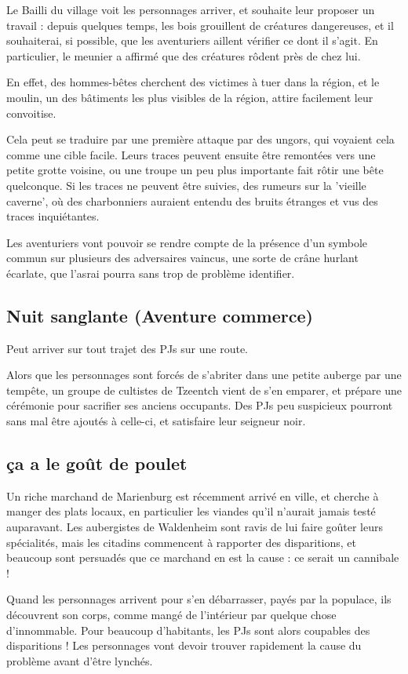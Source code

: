 \documentclass[10pt,a4paper]{book}
\begin{document}
Le Bailli du village voit les personnages arriver, et souhaite leur proposer un travail : depuis quelques temps, les bois grouillent de créatures dangereuses, et il souhaiterai, si possible, que les aventuriers aillent vérifier ce dont il s'agit. En particulier, le meunier a affirmé que des créatures rôdent près de chez lui.

En effet, des hommes-bêtes cherchent des victimes à tuer dans la région, et le moulin, un des bâtiments les plus visibles de la région, attire facilement leur convoitise.

Cela peut se traduire par une première attaque par des ungors, qui voyaient cela comme une cible facile. Leurs traces peuvent ensuite être remontées vers une petite grotte voisine, ou une troupe un peu plus importante fait rôtir une bête quelconque. Si les traces ne peuvent être suivies, des rumeurs sur la 'vieille caverne', où des charbonniers auraient entendu des bruits étranges et vus des traces inquiétantes.

Les aventuriers vont pouvoir se rendre compte de la présence d'un symbole commun sur plusieurs des adversaires vaincus, une sorte de crâne hurlant écarlate, que l'asrai pourra sans trop de problème identifier.
\subsection{Nuit sanglante (Aventure commerce)}
Peut arriver sur tout trajet des PJs sur une route.

Alors que les personnages sont forcés de s'abriter dans une petite auberge par une tempête, un groupe de cultistes de Tzeentch vient de s'en emparer, et prépare une cérémonie pour sacrifier ses anciens occupants. Des PJs peu suspicieux pourront sans mal être ajoutés à celle-ci, et satisfaire leur seigneur noir.
\subsection{ça a le goût de poulet}
Un riche marchand de Marienburg est récemment arrivé en ville, et cherche à manger des plats locaux, en particulier les viandes qu'il n'aurait jamais testé auparavant. Les aubergistes de Waldenheim sont ravis de lui faire goûter leurs spécialités, mais les citadins commencent à rapporter des disparitions, et beaucoup sont persuadés que ce marchand en est la cause : ce serait un cannibale !

Quand les personnages arrivent pour s'en débarrasser, payés par la populace, ils découvrent son corps, comme mangé de l'intérieur par quelque chose d'innommable. Pour beaucoup d'habitants, les PJs sont alors coupables des disparitions ! Les personnages vont devoir trouver rapidement la cause du problème avant d'être lynchés.
\end{document}
